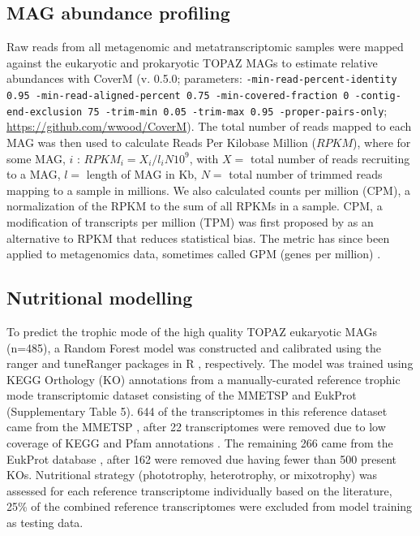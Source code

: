 \documentclass[12pt]{article}
\numberwithin{equation}{section}
\begin{document}
\subsection*{MAG abundance profiling} 

Raw reads from all metagenomic and metatranscriptomic samples were mapped against the eukaryotic and prokaryotic TOPAZ MAGs to estimate relative abundances with CoverM (v. 0.5.0; parameters: \texttt{-min-read-percent-identity 0.95 -min-read-aligned-percent 0.75  -min-covered-fraction 0 -contig-end-exclusion 75 -trim-min 0.05 -trim-max 0.95  -proper-pairs-only}; \url{https://github.com/wwood/CoverM}). The total number of reads mapped to each MAG was then used to calculate Reads Per Kilobase Million ($RPKM$), where for some MAG, $i$ :  $RPKM_i = {X_i}/{l_iN}10^9$, with $X =$ total number of reads recruiting to a MAG, $l =$ length of MAG in Kb, $N =$ total number of trimmed reads mapping to a sample in millions. We also calculated counts per million (CPM), a normalization of the RPKM to the sum of all RPKMs in a sample. CPM, a modification of transcripts per million (TPM) was first proposed by \citet{Wagner_2012} as an alternative to RPKM that reduces statistical bias. The metric has since been applied to metagenomics data, sometimes called GPM (genes per million) \citep{Gradoville_2017}. 

\subsection*{Nutritional modelling} 

To predict the trophic mode of the high quality TOPAZ eukaryotic MAGs (n=485), a Random Forest model \citep{Breiman_2001} was constructed and calibrated using the ranger \citep{Wright_2017} and tuneRanger packages in R \citep{tuneRanger}, respectively. The model was trained using KEGG Orthology (KO) annotations \citep{Kanehisa_2019} from a manually-curated reference trophic mode transcriptomic dataset consisting of the MMETSP \citep{Keeling2014} and EukProt \citep{Richter2020EukProt} (Supplementary Table 5). 644 of the transcriptomes in this reference dataset came from the MMETSP \citep{Keeling2014}, after 22 transcriptomes were removed due to low coverage of KEGG and Pfam annotations \citep{Finn2014Pfam}. The remaining 266 came from the EukProt database \citep{Richter2020EukProt}, after 162 were removed due having fewer than 500 present KOs. Nutritional strategy (phototrophy, heterotrophy, or mixotrophy) was assessed for each reference transcriptome individually based on the literature, 25\% of the combined reference transcriptomes were excluded from model training as testing data. 
\end{document}

